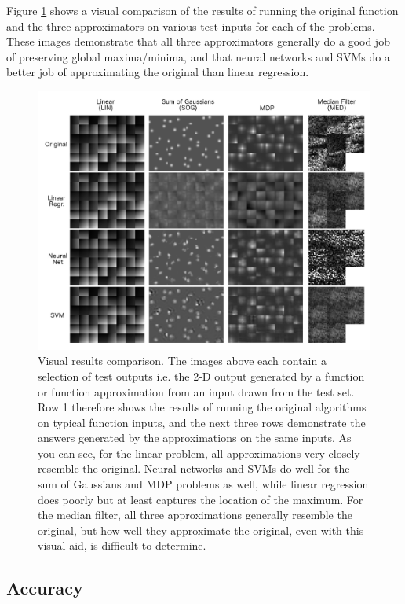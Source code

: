\documentclass{article}
\begin{document}
Figure \ref{fig-pictures} shows a visual comparison of the results of running the original function and the three approximators on various test inputs for each of the problems. These images demonstrate that all three approximators generally do a good job of preserving global maxima/minima, and that neural networks and SVMs do a better job of approximating the original than linear regression.

\begin{figure}
  \centering
  \includegraphics[width=6.3in]{images/results.png}
  \caption{Visual results comparison. The images above each contain a selection of test outputs i.e. the 2-D output generated by a function or function approximation from an input drawn from the test set. Row 1 therefore shows the results of running the original algorithms on typical function inputs, and the next three rows demonstrate the answers generated by the approximations on the same inputs. As you can see, for the linear problem, all approximations very closely resemble the original. Neural networks and SVMs do well for the sum of Gaussians and MDP problems as well, while linear regression does poorly but at least captures the location of the maximum. For the median filter, all three approximations generally resemble the original, but how well they approximate the original, even with this visual aid, is difficult to determine.}
  \label{fig-pictures}
\end{figure}

\subsection{Accuracy}
\end{document}
